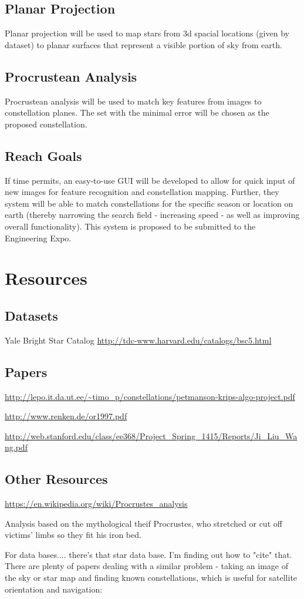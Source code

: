 \documentclass{article}
\begin{document}
\subsection{Planar Projection}
Planar projection will be used to map stars from 3d spacial locations (given by dataset) to planar surfaces that represent a visible portion of sky from earth. \par
\subsection{Procrustean Analysis}
Procrustean analysis will be used to match key features from images to constellation planes. The set with the minimal error will be chosen as the proposed constellation.
\subsection{Reach Goals}
If time permits, an easy-to-use GUI will be developed to allow for quick input of new images for feature recognition and constellation mapping. Further, they system will be able to match constellations for the specific season or location on earth (thereby narrowing the search field - increasing speed - as well as improving overall functionality). This system is proposed to be submitted to the Engineering Expo. 


\section{Resources}


\subsection{Datasets}
Yale Bright Star Catalog
\url{http://tdc-www.harvard.edu/catalogs/bsc5.html}

\subsection{Papers}
\url{http://lepo.it.da.ut.ee/~timo_p/constellations/petmanson-krips-algo-project.pdf}

\url{http://www.renken.de/or1997.pdf}

\url{http://web.stanford.edu/class/ee368/Project_Spring_1415/Reports/Ji_Liu_Wang.pdf}
\subsection{Other Resources}
\url{https://en.wikipedia.org/wiki/Procrustes_analysis}\par
Analysis based on the mythological theif Procrustes, who stretched or cut off victims' limbs so they fit his iron bed. \par


For data bases.... there's that star data base. I'm finding out how to "cite" that.
There are plenty of papers dealing with a similar problem - taking an image of the sky or star map and finding known constellations, which is useful for satellite orientation and navigation:
\end{document}
